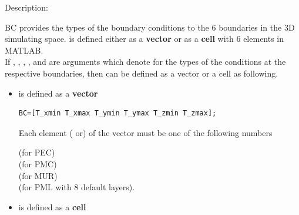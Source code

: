\begin{FontDescr}{Description:}
    \begin{FontPara}{BC}  \label{para:BC}
    provides the types of the boundary conditions to the 6 boundaries in the 3D simulating space.
           is defined either as a \textbf{vector} or as a \textbf{cell} with 6  elements in MATLAB. \vspace{2mm}\\
          If   \label{para:T_xmin},
	   \label{para:T_xmax},
	   \label{para:T_ymin},
	   \label{para:T_ymax},
	   \label{para:T_zmin} and
	   \label{para:T_zmax} are  arguments which denote for the types of the conditions at the respective boundaries, then  can be defined as a vector or a cell as following.\vspace{2mm}\\
    \begin{itemize}
        \item  {} is defined as a \textbf{vector}
	\begin{myindentpar}
	  \begin{lstlisting}[caption={\matv{BC} in the form of a vector},label=BCinvector]
 BC=[T_xmin T_xmax T_ymin T_ymax T_zmin T_zmax];
	  \end{lstlisting}
          Each  element ( or) of the vector  must be  one of the following numbers
	    \begin{myindentpar}
	         \qquad  (for PEC)\\
	         \qquad  (for PMC)\\
	         \qquad  (for MUR)\\
	         \qquad  (for PML with 8 default layers).
	    \end{myindentpar}
      \end{myindentpar}
          \item   {} is defined as a \textbf{cell}
	  \begin{myindentpar}

\end{myindentpar}
\end{itemize}
\end{FontPara}
\end{FontDescr}
